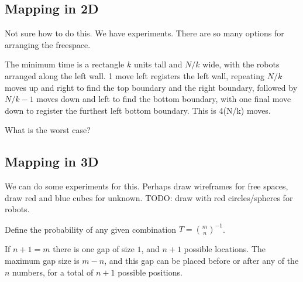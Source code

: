 \subsection{Mapping in 2D}

Not sure how to do this.  We have experiments.  There are so many options for arranging the freespace.  

The minimum time is a rectangle $k$ units tall and $N/k$ wide, with the robots arranged along the left wall. 1 move left registers the left wall, repeating $N/k$ moves up and right to find the top boundary and the right boundary,  followed by $N/k -1$ moves down and left to find the bottom boundary, with one final move down to register the furthest left bottom boundary.  This is 4(N/k) moves. %


What is the worst case?  


\subsection{Mapping in 3D}


We can do some experiments for this.  Perhaps draw wireframes for free spaces, draw red and blue cubes for unknown.  
TODO: draw with red circles/spheres for robots.

Define the probability of any given combination $T= {m \choose n}^{-1}$.  

If $n+1 = m$ there is one gap of size $1$, and $n+1$ possible locations.
The maximum gap size is $m-n$, and this gap can be placed before or after any of the $n$  numbers, for a total of $n+1$ possible positions.



